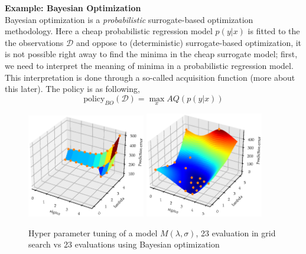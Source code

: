 \begin{tcolorbox}[
    sharp corners,
    boxrule=0mm,
    enhanced,
    borderline west={4pt}{0pt}{gray},
    colframe=drGray,
    colback=drGray,
    coltitle=black,
]
{\large \textbf{Example: Bayesian Optimization}}\\
    Bayesian optimization is a \textit{probabilistic} surrogate-based optimization
    methodology. Here a cheap probabilistic regression model $p(y|x)$ is fitted to the
    the observations $\mathcal{D}$ and oppose to (deterministic) surrogate-based
    optimization, it is not possible right away to find the minima in the cheap
    surrogate model; first, we need to interpret the meaning of minima in a probabilistic
    regression model. This interpretation is done through a so-called acquisition
    function (more about this later). The policy is as following,
    $$\text{policy}_{BO}(\mathcal{D}) = \max_x AQ(p(y|x))$$
\end{tcolorbox}
\begin{figure}[H]%
    \centering
    {\includegraphics[width=0.46\textwidth]{Pictures/BO_vs_Grid2.eps} }%
    \qquad
   {\includegraphics[width=0.46\textwidth]{Pictures/BO_vs_Grid1.eps} }%
    \caption{Hyper parameter tuning of a model $M(\lambda, \sigma)$, 
    23 evaluation in grid search vs 23 evaluations using Bayesian optimization}%
    \label{fig:example}%
\end{figure}

